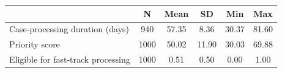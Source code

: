 {
\def\sym#1{\ifmmode^{#1}\else\(^{#1}\)\fi}
\begin{tabular}{l*{1}{ccccc}}
\toprule
                    &           N&        Mean&          SD&         Min&         Max\\
\midrule
Case-processing duration (days)&         940&       57.35&        8.36&       30.37&       81.60\\
Priority score      &        1000&       50.02&       11.90&       30.03&       69.88\\
Eligible for fast-track processing&        1000&        0.51&        0.50&        0.00&        1.00\\
\bottomrule
\end{tabular}
}
